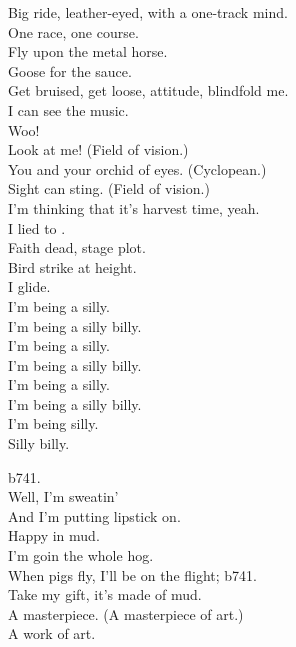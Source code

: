 Big ride, leather-eyed, with a one-track mind. \\
One race, one course. \\
Fly upon the metal horse. \\
Goose for the sauce. \\
Get bruised, get loose, attitude, blindfold me. \\
I can see the music. \\
Woo! \\

Look at me! (Field of vision.) \\
You and your orchid of eyes. (Cyclopean.) \\
Sight can sting. (Field of vision.) \\
I'm thinking that it's harvest time, yeah. \\

I lied to . \\
Faith dead, stage plot. \\
Bird strike at height. \\
I glide. \\

I'm being a silly. \\
I'm being a silly billy. \\
I'm being a silly. \\
I'm being a silly billy. \\
I'm being a silly. \\
I'm being a silly billy. \\
I'm being silly. \\
Silly billy. \\



b741. \\

Well, I'm sweatin' \\
And I'm putting lipstick on. \\
Happy in mud. \\
I'm goin the whole hog. \\

When pigs fly, I'll be on the flight; b741. \\

Take my gift, it's made of mud. \\
A masterpiece. (A masterpiece of art.) \\
A work of art. \\


